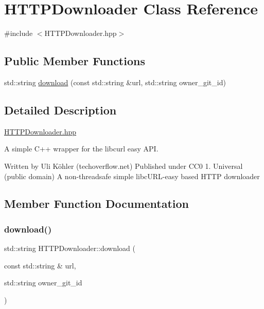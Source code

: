\hypertarget{classHTTPDownloader}{}\section{H\+T\+T\+P\+Downloader Class Reference}
\label{classHTTPDownloader}


{\ttfamily \#include $<$H\+T\+T\+P\+Downloader.\+hpp$>$}

\subsection*{Public Member Functions}
\begin{DoxyCompactItemize}
\item 
std\+::string \hyperlink{classHTTPDownloader_a3b93cc45c2132ffd04c35e45e9a32d8c}{download} (const std\+::string \&url, std\+::string owner\+\_\+git\+\_\+id)
\end{DoxyCompactItemize}


\subsection{Detailed Description}
\hyperlink{HTTPDownloader_8hpp_source}{H\+T\+T\+P\+Downloader.\+hpp}

A simple C++ wrapper for the libcurl easy A\+PI.

Written by Uli Köhler (techoverflow.\+net) Published under C\+C0 1. Universal (public domain) A non-\/threadsafe simple libc\+U\+R\+L-\/easy based H\+T\+TP downloader 

\subsection{Member Function Documentation}
\mbox{\label{classHTTPDownloader_a3b93cc45c2132ffd04c35e45e9a32d8c}} 
\subsubsection{\texorpdfstring{download()}{download()}}
{\footnotesize\ttfamily std\+::string H\+T\+T\+P\+Downloader\+::download (\begin{DoxyParamCaption}\item[{const std\+::string \&}]{url,  }\item[{std\+::string}]{owner\+\_\+git\+\_\+id }\end{DoxyParamCaption})}

